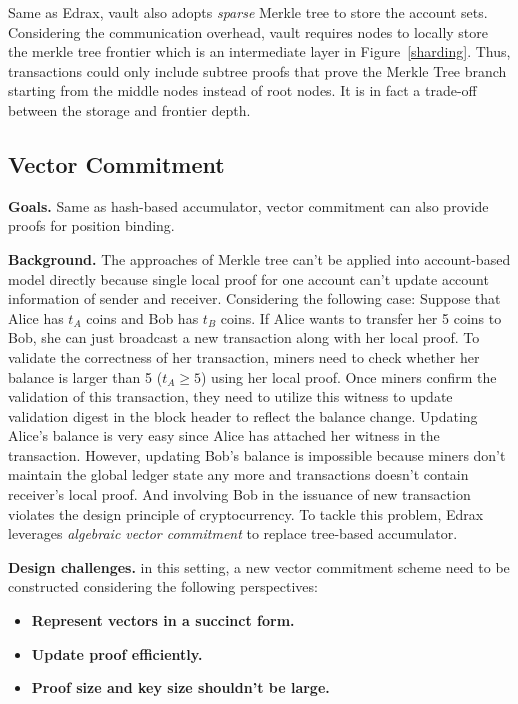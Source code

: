 \documentclass[conference]{IEEEtran}
\begin{document}
Same as Edrax, vault also adopts \textit{sparse} Merkle tree to store the account sets.
%
Considering the communication overhead, vault requires nodes to locally store the merkle tree frontier which is an intermediate layer in Figure~\ref{sharding}.
%
Thus, transactions could only include subtree proofs that prove the Merkle Tree branch starting from the middle nodes instead of root nodes.
%
It is in fact a trade-off between the storage and frontier depth.

\subsection{Vector Commitment}
 
\textbf{Goals.} Same as hash-based accumulator, vector commitment can also provide proofs for position binding.

\textbf{Background.}
The approaches of Merkle tree can't be applied into account-based model directly because single local proof for one account can't update account information of sender and receiver.
%
Considering the following case:
%
Suppose that Alice has $t_A$ coins and Bob has $t_B$ coins.
%
If Alice wants to transfer her 5 coins to Bob, she can just broadcast a new transaction along with her local proof.
%
To validate the correctness of her transaction, miners need to check whether her balance is larger than 5 ($t_A \geq 5$) using her local proof.
%
Once miners confirm the validation of this transaction, they need to utilize this witness to update validation digest in the block header to reflect the balance change.
%
Updating Alice's balance is very easy since Alice has attached her witness in the transaction.
%
However, updating Bob's balance is impossible because miners don't maintain the global ledger state any more and transactions doesn't contain receiver's local proof.
%
And involving Bob in the issuance of new transaction violates the design principle of cryptocurrency.
%
To tackle this problem, Edrax leverages \textit{algebraic vector commitment} to replace tree-based accumulator.

\textbf{Design challenges.} 
in this setting, a new vector commitment scheme need to be constructed considering the following perspectives:
\begin{itemize}
  \item \textbf{Represent vectors in a succinct form.}
  \item \textbf{Update proof efficiently.}
  \item \textbf{Proof size and key size shouldn't be large.}
\end{itemize}
\end{document}
